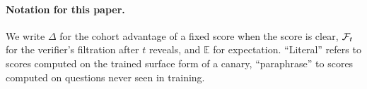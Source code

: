 \paragraph{Notation for this paper.} We write $\Delta$ for the cohort advantage of a
fixed score when the score is clear, $\mathcal{F}_t$ for the verifier's filtration after $t$
reveals, and $\mathbb{E}$ for expectation. ``Literal'' refers to scores computed on
the trained surface form of a canary, ``paraphrase'' to scores computed on questions
never seen in training.

